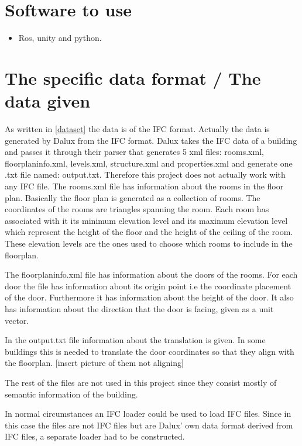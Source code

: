 \section{Software to use}
\begin{itemize}
    \item Ros, unity and python.
\end{itemize}

\section{The specific data format / The data given}
As written in \ref{dataset} the data is of the IFC format. Actually the data is generated by Dalux from the IFC format. Dalux takes the IFC data of a building and passes it through their parser that generates 5 xml files: rooms.xml, floorplaninfo.xml, levels.xml, structure.xml and properties.xml and generate one .txt file named: output.txt. Therefore this project does not actually work with any IFC file.
The rooms.xml file has information about the rooms in the floor plan. Basically the floor plan is generated as a collection of rooms. The coordinates of the rooms are triangles spanning the room. Each room has associated with it its minimum elevation level and its maximum elevation level which represent the height of the floor and the height of the ceiling of the room. These elevation levels are the ones used to choose which rooms to include in the floorplan.

The floorplaninfo.xml file has information about the doors of the rooms. For each door the file has information about its origin point i.e the coordinate placement of the door. Furthermore it has information about the height of the door. It also has information about the direction that the door is facing, given as a unit vector.

In the output.txt file information about the translation is given. In some buildings this is needed to translate the door coordinates so that they align with the floorplan. [insert picture of them not aligning]

The rest of the files are not used in this project since they consist mostly of semantic information of the building.

In normal circumstances an IFC loader could be used to load IFC files. Since in this case the files are not IFC files but are Dalux' own data format derived from IFC files, a separate loader had to be constructed. 




